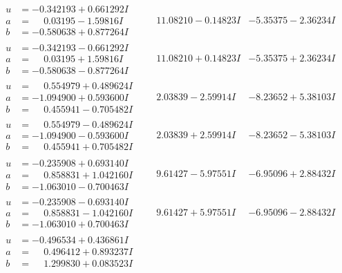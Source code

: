 \documentclass[1p]{elsarticle_modified}
\theoremstyle{definition}
\begin{document}
$$\begin{array}{c|c|c}
\begin{aligned}
u &= -0.342193 + 0.661292 I \\
a &= \phantom{-}0.03195 - 1.59816 I \\
b &= -0.580638 + 0.877264 I\end{aligned}
 & \phantom{-}11.08210 - 0.14823 I & -5.35375 - 2.36234 I \\ \hline\begin{aligned}
u &= -0.342193 - 0.661292 I \\
a &= \phantom{-}0.03195 + 1.59816 I \\
b &= -0.580638 - 0.877264 I\end{aligned}
 & \phantom{-}11.08210 + 0.14823 I & -5.35375 + 2.36234 I \\ \hline\begin{aligned}
u &= \phantom{-}0.554979 + 0.489624 I \\
a &= -1.094900 + 0.593600 I \\
b &= \phantom{-}0.455941 - 0.705482 I\end{aligned}
 & \phantom{-}2.03839 - 2.59914 I & -8.23652 + 5.38103 I \\ \hline\begin{aligned}
u &= \phantom{-}0.554979 - 0.489624 I \\
a &= -1.094900 - 0.593600 I \\
b &= \phantom{-}0.455941 + 0.705482 I\end{aligned}
 & \phantom{-}2.03839 + 2.59914 I & -8.23652 - 5.38103 I \\ \hline\begin{aligned}
u &= -0.235908 + 0.693140 I \\
a &= \phantom{-}0.858831 + 1.042160 I \\
b &= -1.063010 - 0.700463 I\end{aligned}
 & \phantom{-}9.61427 - 5.97551 I & -6.95096 + 2.88432 I \\ \hline\begin{aligned}
u &= -0.235908 - 0.693140 I \\
a &= \phantom{-}0.858831 - 1.042160 I \\
b &= -1.063010 + 0.700463 I\end{aligned}
 & \phantom{-}9.61427 + 5.97551 I & -6.95096 - 2.88432 I \\ \hline\begin{aligned}
u &= -0.496534 + 0.436861 I \\
a &= \phantom{-}0.496412 + 0.893237 I \\
b &= \phantom{-}1.299830 + 0.083523 I\end{aligned}

\end{array}$$
\end{document}
